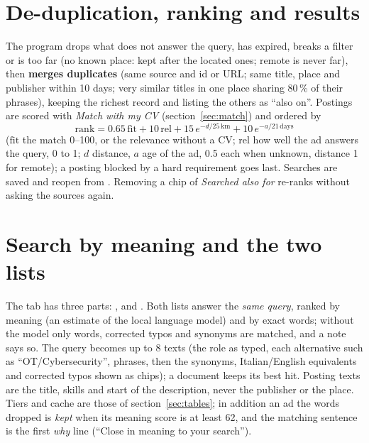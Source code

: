 \section{De-duplication, ranking and results}
The program drops what does not answer the query, has expired, breaks a filter or is too far (no known place: kept
after the located ones; remote is never far), then \textbf{merges duplicates} (same source and id or URL; same title,
place and publisher within 10 days; very similar titles in one place sharing 80\,\% of their phrases), keeping the
richest record and listing the others as ``also on''. Postings are scored with \emph{Match with my CV} (section~\ref{sec:match}) and ordered by
\[
\mathrm{rank}=0.65\,\mathrm{fit}+10\,\mathrm{rel}+15\,e^{-d/25\,\mathrm{km}}+10\,e^{-a/21\,\mathrm{days}}
\]
($\mathrm{fit}$ the match 0--100, or the relevance without a CV; $\mathrm{rel}$ how well the ad answers the query,
0 to 1; $d$ distance, $a$ age of the ad, 0.5 each when unknown, distance 1 for remote); a posting blocked by a
hard requirement goes last. Searches are saved and reopen from . Removing a
chip of \emph{Searched also for} re-ranks without asking the sources again.

\section{Search by meaning and the two lists}\label{sec:jobmeaning}
The tab has three parts: ,  and . Both lists answer the \emph{same query}, ranked by meaning (an estimate of the local language model) and
by exact words; without the model only words, corrected typos and synonyms are matched, and a note says so. The
query becomes up to 8 texts (the role as typed, each alternative such as ``OT/Cybersecurity'', phrases, then the
synonyms, Italian/English equivalents and corrected typos shown as chips); a document keeps its best hit. Posting
texts are the title, skills and start of the description, never the publisher or the place. Tiers and cache are
those of section~\ref{sec:tables}; in addition an ad the words dropped is \emph{kept} when its meaning score is at
least 62, and the matching sentence is the first \emph{why} line (``Close in meaning to your search'').

